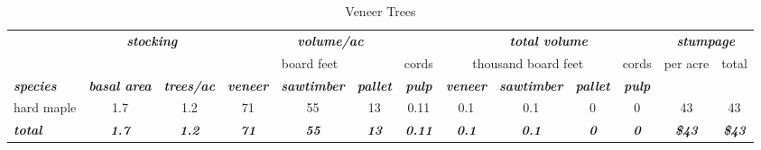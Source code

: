 \documentclass[landscape]{article}
\begin{document}
\begin{table}[H]

\caption{\label{tab:unnamed-chunk-60}Veneer Trees}
\fontsize{10}{12}\selectfont
\begin{tabular}[t]{lcccccccccccc}
\toprule
\multicolumn{1}{c}{\em{\textbf{ }}} & \multicolumn{2}{c}{\em{\textbf{stocking}}} & \multicolumn{4}{c}{\em{\textbf{volume/ac }}} & \multicolumn{4}{c}{\em{\textbf{total volume}}} & \multicolumn{2}{c}{\em{\textbf{stumpage}}} \\
\cmidrule(l{3pt}r{3pt}){2-3} \cmidrule(l{3pt}r{3pt}){4-7} \cmidrule(l{3pt}r{3pt}){8-11} \cmidrule(l{3pt}r{3pt}){12-13}
\multicolumn{3}{c}{ } & \multicolumn{3}{c}{board feet} & \multicolumn{1}{c}{cords} & \multicolumn{3}{c}{thousand board feet} & \multicolumn{1}{c}{cords} & \multicolumn{1}{c}{per acre} & \multicolumn{1}{c}{total} \\
\cmidrule(l{3pt}r{3pt}){4-6} \cmidrule(l{3pt}r{3pt}){7-7} \cmidrule(l{3pt}r{3pt}){8-10} \cmidrule(l{3pt}r{3pt}){11-11} \cmidrule(l{3pt}r{3pt}){12-12} \cmidrule(l{3pt}r{3pt}){13-13}
\rowcolor[HTML]{DCDCDC}  \em{\textbf{species}} & \em{\textbf{basal area}} & \em{\textbf{trees/ac}} & \em{\textbf{veneer}} & \em{\textbf{sawtimber}} & \em{\textbf{pallet}} & \em{\textbf{pulp}} & \em{\textbf{veneer}} & \em{\textbf{sawtimber}} & \em{\textbf{pallet}} & \em{\textbf{pulp}} & \em{\textbf{ }} & \em{\textbf{ }}\\
\midrule
\rowcolor{gray!6}  hard maple & 1.7 & 1.2 & 71 & 55 & 13 & 0.11 & 0.1 & 0.1 & 0 & 0 & 43 & 43\\
 
\rowcolor[HTML]{DCDCDC}  \em{\textbf{total}} & \em{\textbf{1.7}} & \em{\textbf{1.2}} & \em{\textbf{71}} & \em{\textbf{55}} & \em{\textbf{13}} & \em{\textbf{0.11}} & \em{\textbf{0.1}} & \em{\textbf{0.1}} & \em{\textbf{0}} & \em{\textbf{0}} & \em{\textbf{\$43}} & \em{\textbf{\$43}}\\
\bottomrule
\end{tabular}
\end{table}
\end{document}
